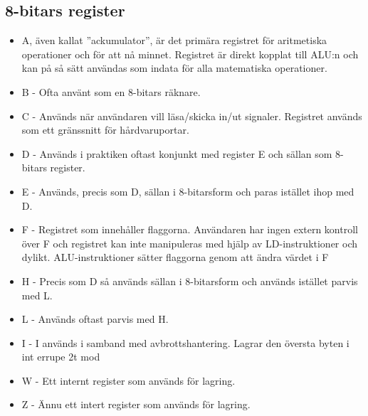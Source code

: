 \documentclass{article}
\begin{document}
\subsection{8-bitars register}
\begin{itemize}
    \item A, även kallat ''ackumulator'', är det primära registret för aritmetiska operationer och för att nå minnet. Registret är direkt kopplat till ALU:n och kan på så sätt användas som indata för alla matematiska operationer.
    \item B - Ofta använt som en 8-bitars räknare.
    \item C - Används när användaren vill läsa/skicka in/ut signaler. Registret används som ett gränssnitt för hårdvaruportar.
    \item D - Används i praktiken oftast konjunkt med register E och sällan som 8-bitars register.
    \item E - Används, precis som D, sällan i 8-bitarsform och paras istället ihop med D.
    \item F - Registret som innehåller flaggorna. Användaren har ingen extern kontroll över F och registret kan inte manipuleras med hjälp av LD-instruktioner och dylikt. ALU-instruktioner sätter flaggorna genom att ändra värdet i F
    \item H - Precis som D så används sällan i 8-bitarsform och används istället parvis med L.
    \item L - Används oftast parvis med H.
    \item I - I används i samband med avbrottshantering. Lagrar den översta byten i int
    errupe 2t mod\item W - Ett internt register som används för lagring.
    \item Z - Ännu ett intert register som används för lagring.
\end{itemize}
\end{document}

